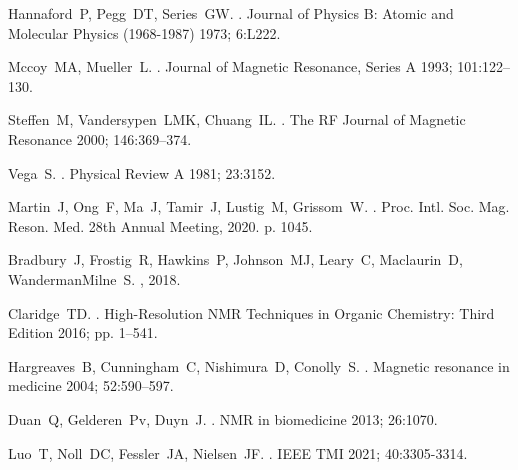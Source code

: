 \documentclass{article}
\begin{document}
\begin{thebibliography}{10}
Hannaford~P, Pegg~DT, Series~GW.
.
\newblock Journal of Physics B: Atomic and Molecular Physics (1968-1987) 1973;
  6:L222.

Mccoy~MA, Mueller~L.
.
\newblock Journal of Magnetic Resonance, Series A 1993; 101:122--130.

Steffen~M, Vandersypen~LMK, Chuang~IL.
.
\newblock The RF Journal of Magnetic Resonance 2000; 146:369--374.

Vega~S.
.
\newblock Physical Review A 1981; 23:3152.

Martin~J, Ong~F, Ma~J, Tamir~J, Lustig~M, Grissom~W.
.
  Proc. Intl. Soc. Mag. Reson. Med. 28th Annual Meeting, 2020.  p. 1045.

Bradbury~J, Frostig~R, Hawkins~P, Johnson~MJ, Leary~C, Maclaurin~D,
  WandermanMilne~S.
, 2018.

Claridge~TD.
.
\newblock High-Resolution NMR Techniques in Organic Chemistry: Third Edition
  2016; pp. 1--541.

Hargreaves~B, Cunningham~C, Nishimura~D, Conolly~S.
.
\newblock Magnetic resonance in medicine 2004; 52:590--597.

Duan~Q, Gelderen~Pv, Duyn~J.
.
\newblock NMR in biomedicine 2013; 26:1070.

Luo~T, Noll~DC, Fessler~JA, Nielsen~JF.
.
\newblock IEEE TMI 2021; 40:3305-3314.



\end{thebibliography}
\end{document}
